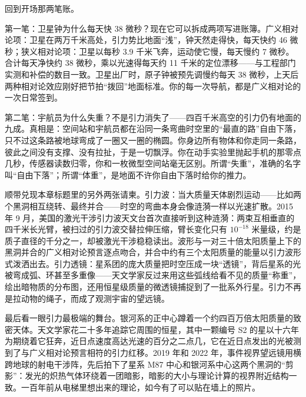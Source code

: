\begin{mainline}
回到开场那两笔账。

第一笔：卫星钟为什么每天快 38 微秒？现在它可以拆成两项写进账簿。广义相对论项：卫星在两万千米高处，引力势比地面“浅”，钟天然走得快，每天快约 46 微秒；狭义相对论项：卫星以每秒 3.9 千米飞奔，运动使它慢，每天慢约 7 微秒。合计每天净快约 38 微秒，乘以光速得每天约 11 千米的定位漂移——与工程部门实测和补偿的数目一致。卫星出厂时，原子钟被预先调慢约每天 38 微秒，上天后两种相对论效应刚好把节拍“拨回”地面标准。你的每一次导航，都是广义相对论的一次日常签到。

第二笔：宇航员为什么失重？不是引力消失了——四百千米高空的引力仍有地面的九成。真相是：空间站和宇航员都在沿同一条弯曲时空里的“最直的路”自由下落，只不过这条路被地球弯成了一圈又一圈的椭圆。你身边所有物体和你走同一条路，彼此之间没有支撑、没有拉扯，于是一切飘浮。你在动手实验里抛起手机的那零点几秒，传感器读数归零，你和一枚微型空间站毫无区别。所谓“失重”，准确的名字叫“自由下落”；所谓“体重”，是地面不许你自由下落时给你的推力。

顺带兑现本章标题里的另外两张请柬。引力波：当大质量天体剧烈运动——比如两个黑洞相互绕转、最终并合——时空的弯曲本身会像涟漪一样以光速扩散。2015 年 9 月，美国的激光干涉引力波天文台首次直接听到这种涟漪：两束互相垂直的四千米长光臂，被扫过的引力波交替拉伸压缩，臂长变化只有 \(10^{-18}\) 米量级，约是质子直径的千分之一，却被激光干涉稳稳读出。波形与一对三十倍太阳质量上下的黑洞并合的广义相对论预言逐点吻合，并合中约有三个太阳质量的能量以引力波形式泼洒出去。引力透镜：星系团的庞大质量把时空压成一块“透镜”，背后星系的光被弯成弧、环甚至多重像——天文学家反过来用这些弧线给看不见的质量“称重”，绘出暗物质的分布图，还用恒星级质量的微透镜捕捉到了一批系外行星。引力不再是拉动物的绳子，而成了观测宇宙的望远镜。

最后看一眼引力最极端的舞台。银河系的正中心蹲着一个约四百万倍太阳质量的致密天体。天文学家花二十多年追踪它周围的恒星，其中一颗编号 S2 的星以十六年为期绕着它狂奔，近日点速度高达光速的百分之二点几，它在近日点发出的光被测到了与广义相对论预言相符的引力红移。2019 年和 2022 年，事件视界望远镜用横跨地球的射电干涉阵，先后拍下了星系 M87 中心和银河系中心这两个黑洞的“剪影”：发光的炽热气体环绕着一团暗影，暗影的大小与理论计算的视界附近结构一致。一百年前从电梯里想出来的理论，如今有了可以贴在墙上的照片。
\end{mainline}


